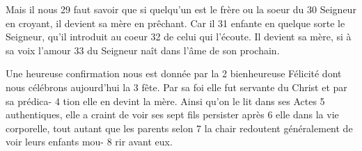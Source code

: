 Mais il nous	 
29	 	faut savoir que si quelqu'un est le frère ou la soeur du	 
30	 	Seigneur en croyant, il devient sa mère en prêchant. Car il	 
31	 	enfante en quelque sorte le Seigneur, qu'il introduit au coeur	 
32	 	de celui qui l'écoute. Il devient sa mère, si à sa voix l'amour	 
33	 	du Seigneur naît dans l'âme de son prochain.

Une heureuse confirmation nous est donnée par la	 
2	 	bienheureuse Félicité dont nous célébrons aujourd'hui la	 
3	 	fête. Par sa foi elle fut servante du Christ et par sa prédica-	 
4	 	tion elle en devint la mère. Ainsi qu'on le lit dans ses Actes	 
5	 	authentiques, elle a craint de voir ses sept fils persister après	 
6	 	elle dans la vie corporelle, tout autant que les parents selon	 
7	 	la chair redoutent généralement de voir leurs enfants mou-	 
8	 	rir avant eux.